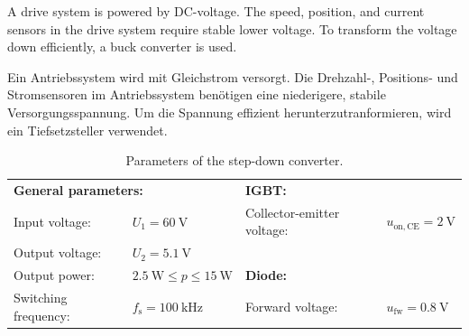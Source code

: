


A drive system is powered by DC-voltage.
The speed, position, and current sensors in the drive system require stable lower voltage.
To transform the voltage down efficiently, a buck converter is used.

\begin{germanblock}
	Ein Antriebssystem wird mit Gleichstrom versorgt.
	Die Drehzahl-, Positions- und Stromsensoren im Antriebssystem benötigen eine niederigere, stabile Versorgungsspannung.
	Um die Spannung effizient herunterzutranformieren, wird ein Tiefsetzsteller verwendet.
\end{germanblock}



\begin{table}[ht]
	\centering  %
	\begin{tabular}{llll}
		\toprule
		\multicolumn{2}{l}{\textbf{General parameters:}} & \multicolumn{2}{l}{\textbf{IGBT:}}                                                                                               \\
		Input voltage:                                   & $U_{\mathrm{1}} = \SI{60}{\volt}$          & Collector-emitter voltage:          & $u_{\mathrm{on},\mathrm{CE}} = \SI{2}{\volt}$ \\
		Output voltage:                                  & $U_2 = \SI{5.1}{\volt}$                    &                                     &                                               \\
		Output power:                                    & $\SI{2.5}{\watt} \le p \le \SI{15}{\watt}$ & \multicolumn{2}{l}{\textbf{Diode:}}                                                 \\
		Switching frequency:                             & $f_\mathrm{s} = \SI{100}{\kilo\hertz}$     & Forward voltage:                    & $u_\mathrm{fw} = \SI{0.8}{\volt}$             \\
		\bottomrule
	\end{tabular}
	\caption{Parameters of the step-down converter.}  %
	\label{table:ex01_Parameters of the circuit}
\end{table}

